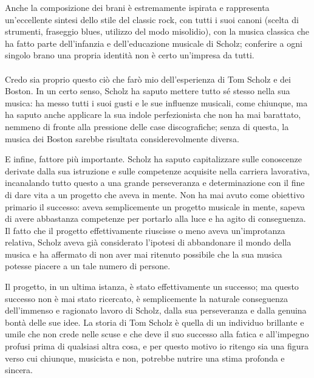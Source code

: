 \documentclass[class=book, crop=false, oneside, 12pt]{standalone}
\begin{document}
Anche la composizione dei brani è estremamente ispirata e rappresenta un'eccellente sintesi dello stile del classic rock, con tutti i suoi canoni (scelta di strumenti, fraseggio blues, utilizzo del modo misolidio), con la musica classica che ha fatto parte dell'infanzia e dell'educazione musicale di Scholz; conferire a ogni singolo brano una propria identità non è certo un'impresa da tutti.

\paragraph{}
Credo sia proprio questo ciò che farò mio dell'esperienza di Tom Scholz e dei Boston. In un certo senso, Scholz ha saputo mettere tutto sé stesso nella sua musica: ha messo tutti i suoi gusti e le sue influenze musicali, come chiunque, ma ha saputo anche applicare la sua indole perfezionista che non ha mai barattato, nemmeno di fronte alla pressione delle case discografiche; senza di questa, la musica dei Boston sarebbe risultata considerevolmente diversa.

E infine, fattore più importante. Scholz ha saputo capitalizzare sulle conoscenze derivate dalla sua istruzione e sulle competenze acquisite nella carriera lavorativa, incanalando tutto questo a una grande perseveranza e determinazione con il fine di dare vita a un progetto che aveva in mente. Non ha mai avuto come obiettivo primario il successo: aveva semplicemente un progetto musicale in mente, sapeva di avere abbastanza competenze per portarlo alla luce e ha agito di conseguenza. Il fatto che il progetto effettivamente riuscisse o meno aveva un'improtanza relativa, Scholz aveva già considerato l'ipotesi di abbandonare il mondo della musica e ha affermato di non aver mai ritenuto possibile che la sua musica potesse piacere a un tale numero di persone.

Il progetto, in un ultima istanza, è stato effettivamente un successo; ma questo successo non è mai stato ricercato, è semplicemente la naturale conseguenza dell'immenso e ragionato lavoro di Scholz, dalla sua perseveranza e dalla genuina bontà delle sue idee. La storia di Tom Scholz è quella di un individuo brillante e umile che non crede nelle scuse e che deve il suo successo alla fatica e all'impegno profusi prima di qualsiasi altra cosa, e per questo motivo io ritengo sia una figura verso cui chiunque, musicista e non, potrebbe nutrire una stima profonda e sincera. 
\end{document}
